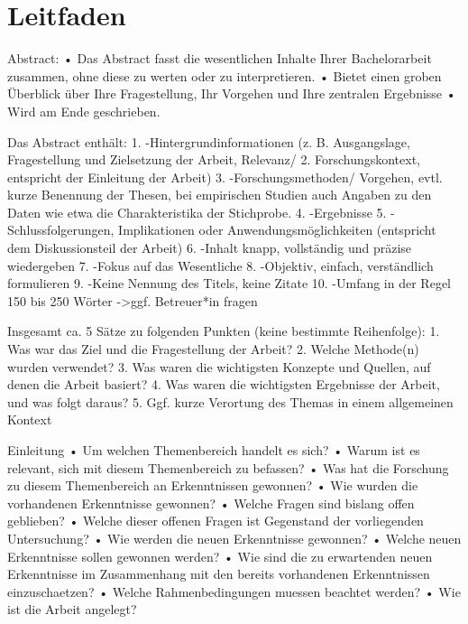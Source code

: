 \section*{Leitfaden}
Abstract:
•	Das Abstract fasst die wesentlichen Inhalte Ihrer Bachelorarbeit zusammen, ohne diese zu werten oder zu interpretieren.
•	Bietet einen groben Überblick über Ihre Fragestellung, Ihr Vorgehen und Ihre zentralen Ergebnisse
•	Wird am Ende geschrieben.

Das Abstract enthält:
1.	-Hintergrundinformationen (z. B. Ausgangslage, Fragestellung und Zielsetzung der Arbeit, Relevanz/
2.	Forschungskontext, entspricht der Einleitung der Arbeit)
3.	-Forschungsmethoden/ Vorgehen, evtl. kurze Benennung der Thesen, bei empirischen Studien auch Angaben zu den Daten wie etwa die Charakteristika der Stichprobe.
4.	-Ergebnisse
5.	-Schlussfolgerungen, Implikationen oder Anwendungsmöglichkeiten (entspricht dem Diskussionsteil der Arbeit) 
6.	-Inhalt knapp, vollständig und präzise wiedergeben
7.	-Fokus auf das Wesentliche
8.	-Objektiv, einfach, verständlich formulieren
9.	-Keine Nennung des Titels, keine Zitate
10.	-Umfang in der Regel 150 bis 250 Wörter ->ggf. Betreuer*in fragen

Insgesamt ca. 5 Sätze zu folgenden Punkten (keine bestimmte Reihenfolge): 
1.	Was war das Ziel und die Fragestellung der Arbeit? 
2.	Welche Methode(n) wurden verwendet? 
3.	Was waren die wichtigsten Konzepte und Quellen, auf denen die Arbeit basiert? 
4.	Was waren die wichtigsten Ergebnisse der Arbeit, und was folgt daraus? 
5.	Ggf. kurze Verortung des Themas in einem allgemeinen Kontext



Einleitung
•	Um welchen Themenbereich handelt es sich?
•	Warum ist es relevant, sich mit diesem Themenbereich zu befassen?
•	Was hat die Forschung zu diesem Themenbereich an Erkenntnissen gewonnen?
•	Wie wurden die vorhandenen Erkenntnisse gewonnen?
•	Welche Fragen sind bislang offen geblieben?
•	Welche dieser offenen Fragen ist Gegenstand der vorliegenden Untersuchung?
•	Wie werden die neuen Erkenntnisse gewonnen?
•	Welche neuen Erkenntnisse sollen gewonnen werden?
•	Wie sind die zu erwartenden neuen Erkenntnisse im Zusammenhang mit den bereits vorhandenen Erkenntnissen einzuschaetzen?
•	Welche Rahmenbedingungen muessen beachtet werden?
•	Wie ist die Arbeit angelegt?


